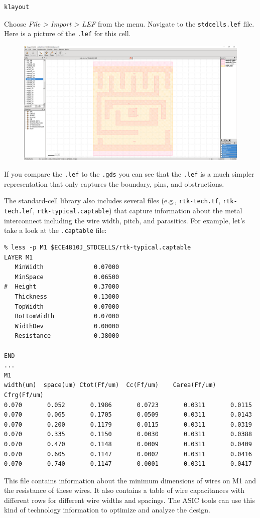 \documentclass[a4paper,12pt,twoside]{article}
\begin{document}
\begin{verbatim}
klayout
\end{verbatim}
Choose \textit{File > Import > LEF} from the menu. Navigate to the \texttt{stdcells.lef} file. Here is a picture of the \texttt{.lef} for this cell.
\begin{figure}[H]
    \centering
    \includegraphics[width=\textwidth]{images/7.png}
\end{figure}
If you compare the \texttt{.lef} to the \texttt{.gds} you can see that the \texttt{.lef} is a much simpler representation that only captures the boundary, pins, and obstructions.

The standard-cell library also includes several files (e.g., \texttt{rtk-tech.tf}, \texttt{rtk-tech.lef}, \texttt{rtk-typical.captable}) that capture information about the metal interconnect including the wire width, pitch, and parasitics. For example, let’s take a look at the \texttt{.captable} file:
\begin{verbatim}
% less -p M1 $ECE4810J_STDCELLS/rtk-typical.captable
LAYER M1
   MinWidth              0.07000
   MinSpace              0.06500
#  Height                0.37000
   Thickness             0.13000
   TopWidth              0.07000
   BottomWidth           0.07000
   WidthDev              0.00000
   Resistance            0.38000

END
...
M1
width(um)  space(um) Ctot(Ff/um)  Cc(Ff/um)    Carea(Ff/um) Cfrg(Ff/um)
0.070       0.052       0.1986       0.0723       0.0311       0.0115
0.070       0.065       0.1705       0.0509       0.0311       0.0143
0.070       0.200       0.1179       0.0115       0.0311       0.0319
0.070       0.335       0.1150       0.0030       0.0311       0.0388
0.070       0.470       0.1148       0.0009       0.0311       0.0409
0.070       0.605       0.1147       0.0002       0.0311       0.0416
0.070       0.740       0.1147       0.0001       0.0311       0.0417
\end{verbatim}
This file contains information about the minimum dimensions of wires on M1 and the resistance of these wires. It also contains a table of wire capacitances with different rows for different wire widths and spacings. The ASIC tools can use this kind of technology information to optimize and analyze the design.
\end{document}
